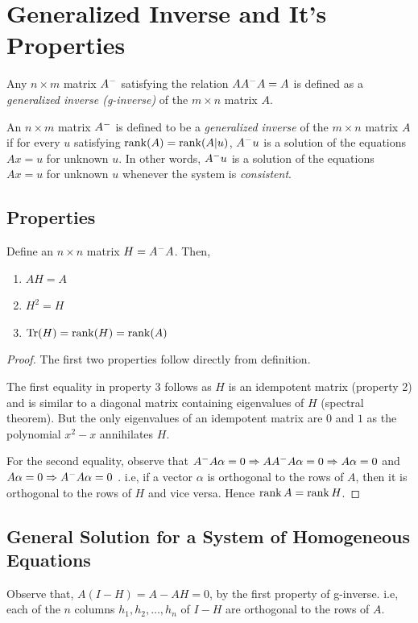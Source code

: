\documentclass[10pt, a4paper]{article}
\begin{document}
\section{Generalized Inverse and It's Properties}
\begin{definition}
Any \( n \times m \) matrix \( A^{-} \) satisfying the relation \( AA^{-}A = A \) is defined as a \textit{generalized inverse (g-inverse)} of the \( m \times n \) matrix \( A \).
\end{definition}
\begin{definition}
	An \( n \times m \) matrix \( A^{-} \) is defined to be a \textit{generalized inverse} of the \( m \times n \) matrix \( A \) if for every \( u \) satisfying \( \operatorname{rank}(A) = \operatorname{rank}(A|u) \), \( A^{-}u \) is a solution of the equations \( Ax = u \) for unknown \( u \). 
		In other words, \( A^{-}u \) is a solution of the equations \( Ax = u \) for unknown \( u \) whenever the system is \textit{consistent}.
\end{definition}

\subsection{Properties}
Define an \( n \times n \) matrix \( H = A^{-}A \). Then, 
\begin{enumerate}[1.]
	\item \( AH = A \)
	\item \( H^{2} = H \)
	\item \( \operatorname{Tr}(H) = \operatorname{rank}(H) = \operatorname{rank}(A) \)
\end{enumerate}
\begin{proof}
The first two properties follow directly from definition. 

The first equality in property 3 follows as \( H \) is an idempotent matrix (property 2) and is similar to a diagonal matrix containing eigenvalues of \( H \) (spectral theorem). But the only eigenvalues of an idempotent matrix are \( 0 \) and \( 1 \) as the polynomial \( x^2 - x \) annihilates \( H \).

For the second equality, observe that \( A^{-} A \alpha = 0 \Rightarrow A A^{-} A \alpha = 0 \Rightarrow A\alpha = 0\) and \( A\alpha = 0 \Rightarrow A^{-} A \alpha = 0 \) . i.e, if a vector \( \alpha \) is orthogonal to the rows of \( A \), then it is orthogonal to the rows of \( H \) and vice versa. Hence \( \operatorname{rank}{A} = \operatorname{rank}{H} \).
\end{proof}

\subsection[System of Homogeneous Equations]{General Solution for a System of Homogeneous Equations}
Observe that, \( A(I-H) = A - AH = 0 \), by the first property of g-inverse. i.e, each of the \( n \) columns \( h_{1}, h_{2}, \dots, h_{n} \) of \( I-H \) are orthogonal to the rows of \( A \).
\end{document}
